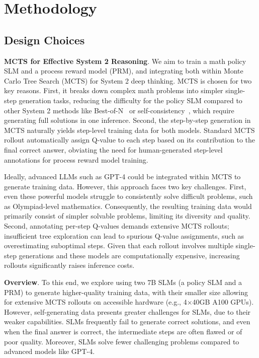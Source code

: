 \section{Methodology}





\subsection{Design Choices}
\noindent\textbf{MCTS for Effective System 2 Reasoning}. 
We aim to train a math policy SLM and a process reward model (PRM), and integrating both within Monte Carlo Tree Search (MCTS) for System 2 deep thinking. MCTS is chosen for two key reasons. First, it breaks down complex math problems into simpler single-step generation tasks, reducing the difficulty for the policy SLM compared to other System 2 methods like Best-of-N~\citep{brown2024large} or self-consistency~\citep{selfconsistency}, which require generating full solutions in one inference. 
 Second, the step-by-step generation in MCTS naturally yields step-level training data for both models. Standard MCTS rollout  automatically assign Q-value to each step based on its contribution to the final correct answer, obviating the need for human-generated step-level  annotations for process reward model training.

 
 
 
Ideally, advanced LLMs such as GPT-4 could be integrated within MCTS to generate training data. However, this approach faces two key challenges. First,  even these powerful models struggle to consistently solve difficult problems, such as Olympiad-level mathematics. Consequently, the resulting training data would primarily consist of simpler solvable problems, limiting its diversity and quality.  Second, annotating per-step Q-values demands extensive MCTS rollouts; insufficient tree exploration can lead to spurious Q-value assignments, such as overestimating suboptimal steps. Given that each rollout involves multiple single-step generations and these models are computationally expensive, increasing rollouts significantly raises inference costs.
 



\noindent\textbf{Overview}. To this end, we explore using two 7B SLMs (a policy SLM and a PRM) to generate higher-quality training data, with their smaller size allowing for extensive MCTS rollouts on accessible hardware (e.g., 4$\times$40GB A100 GPUs). However, self-generating data presents greater challenges for SLMs, due to their weaker capabilities.
SLMs frequently fail to generate correct solutions, and even when the final answer is correct, the intermediate steps are often flawed or of poor quality. Moreover, SLMs solve fewer challenging problems compared to advanced models like GPT-4.

